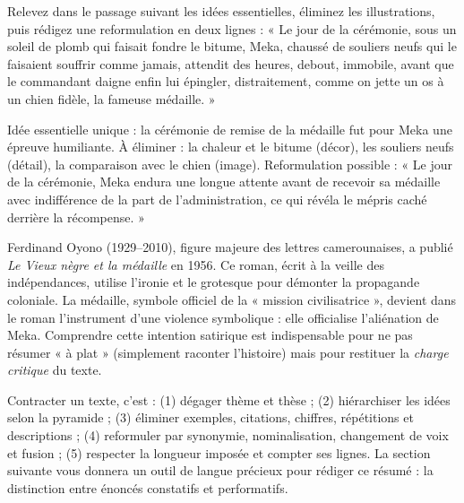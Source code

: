 \documentclass[11pt]{article}
\begin{document}
\begin{exercice}
Relevez dans le passage suivant les idées essentielles, éliminez les illustrations, puis rédigez une reformulation en deux lignes : « Le jour de la cérémonie, sous un soleil de plomb qui faisait fondre le bitume, Meka, chaussé de souliers neufs qui le faisaient souffrir comme jamais, attendit des heures, debout, immobile, avant que le commandant daigne enfin lui épingler, distraitement, comme on jette un os à un chien fidèle, la fameuse médaille. »
\end{exercice}

\begin{corrige}[Exercice 1]
Idée essentielle unique : la cérémonie de remise de la médaille fut pour Meka une épreuve humiliante. À éliminer : la chaleur et le bitume (décor), les souliers neufs (détail), la comparaison avec le chien (image). Reformulation possible : « Le jour de la cérémonie, Meka endura une longue attente avant de recevoir sa médaille avec indifférence de la part de l'administration, ce qui révéla le mépris caché derrière la récompense. »
\end{corrige}

\begin{savaistu}
Ferdinand Oyono (1929--2010), figure majeure des lettres camerounaises, a publié \emph{Le Vieux nègre et la médaille} en 1956. Ce roman, écrit à la veille des indépendances, utilise l'ironie et le grotesque pour démonter la propagande coloniale. La médaille, symbole officiel de la « mission civilisatrice », devient dans le roman l'instrument d'une violence symbolique : elle officialise l'aliénation de Meka. Comprendre cette intention satirique est indispensable pour ne pas résumer « à plat » (simplement raconter l'histoire) mais pour restituer la \emph{charge critique} du texte.
\end{savaistu}

\begin{aretenir}
Contracter un texte, c'est : (1) dégager thème et thèse ; (2) hiérarchiser les idées selon la pyramide ; (3) éliminer exemples, citations, chiffres, répétitions et descriptions ; (4) reformuler par synonymie, nominalisation, changement de voix et fusion ; (5) respecter la longueur imposée et compter ses lignes. La section suivante vous donnera un outil de langue précieux pour rédiger ce résumé : la distinction entre énoncés constatifs et performatifs.
\end{aretenir}
\end{document}
